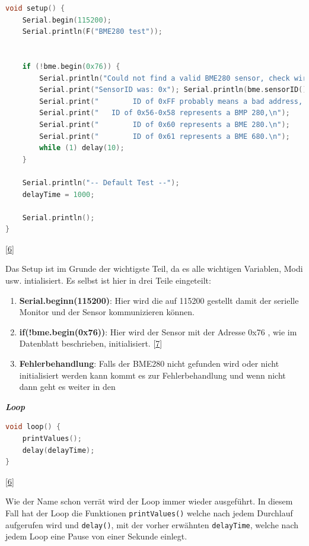 \documentclass[
    headings=optiontotocandhead,%
    twoside,
    numbers=noenddot,%
    12pt, %
    titlepage, %
    parskip=full, %
    listof=leveldown, 
    numbers=noenddot, %
    a4paper,DIV=14,
    BCOR=15mm,
]{scrbook}
\newcommand{\passthrough}[1]{#1}
\providecommand{\tightlist}{%
  \setlength{\itemsep}{0pt}\setlength{\parskip}{0pt}}
\begin{document}
\begin{lstlisting}[language={C++}, caption={Setup BME}]
void setup() {
    Serial.begin(115200);
    Serial.println(F("BME280 test"));

    
    if (!bme.begin(0x76)) {
        Serial.println("Could not find a valid BME280 sensor, check wiring, address, sensor ID!");
        Serial.print("SensorID was: 0x"); Serial.println(bme.sensorID(),16);
        Serial.print("        ID of 0xFF probably means a bad address, a BMP 180 or BMP 085\n");
        Serial.print("   ID of 0x56-0x58 represents a BMP 280,\n");
        Serial.print("        ID of 0x60 represents a BME 280.\n");
        Serial.print("        ID of 0x61 represents a BME 680.\n");
        while (1) delay(10);
    }
    
    Serial.println("-- Default Test --");
    delayTime = 1000;

    Serial.println();
}
\end{lstlisting}

{[}\protect\hyperlink{ref-BME280-Test}{6}{]}

Das Setup ist im Grunde der wichtigste Teil, da es alle wichtigen
Variablen, Modi usw. intialisiert. Es selbst ist hier in drei Teile
eingeteilt:

\begin{enumerate}
\def\labelenumi{\arabic{enumi}.}
\tightlist
\item
  \textbf{Serial.beginn(115200)}: Hier wird die auf 115200 gestellt
  damit der serielle Monitor und der Sensor kommunizieren können.
\item
  \textbf{if(!bme.begin(0x76))}: Hier wird der Sensor mit der Adresse
  0x76 , wie im Datenblatt beschrieben, initialisiert.
  {[}\protect\hyperlink{ref-BME280-Datasheet}{7}{]}
\item
  \textbf{Fehlerbehandlung}: Falls der BME280 nicht gefunden wird oder
  nicht initialisiert werden kann kommt es zur Fehlerbehandlung und wenn
  nicht dann geht es weiter in den
\end{enumerate}

\textbf{\emph{Loop}}

\begin{lstlisting}[language={C++}, caption={Loop BME}]
void loop() { 
    printValues();
    delay(delayTime);
}
\end{lstlisting}

{[}\protect\hyperlink{ref-BME280-Test}{6}{]}

Wie der Name schon verrät wird der Loop immer wieder ausgeführt. In
diesem Fall hat der Loop die Funktionen
\passthrough{\lstinline!printValues()!} welche nach jedem Durchlauf
aufgerufen wird und \passthrough{\lstinline!delay()!}, mit der vorher
erwähnten \passthrough{\lstinline!delayTime!}, welche nach jedem Loop
eine Pause von einer Sekunde einlegt.
\end{document}
